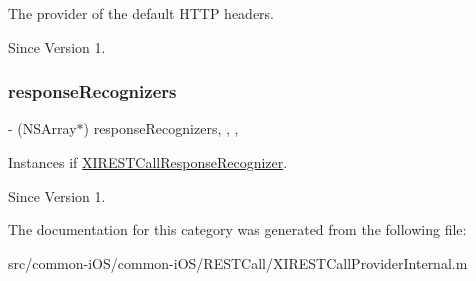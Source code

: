 The provider of the default H\+T\+TP headers. 

\begin{DoxySince}{Since}
Version 1. 
\end{DoxySince}
\hypertarget{category_x_i_r_e_s_t_call_provider_internal_07_08_a4237fa2603c1975960fb81854773b15a}{}\label{category_x_i_r_e_s_t_call_provider_internal_07_08_a4237fa2603c1975960fb81854773b15a} 
\subsubsection{\texorpdfstring{response\+Recognizers}{responseRecognizers}}
{\footnotesize\ttfamily -\/ (N\+S\+Array$\ast$) response\+Recognizers\hspace{0.3cm}{\ttfamily [read]}, {\ttfamily [write]}, {\ttfamily [nonatomic]}, {\ttfamily [strong]}}



Instances if \hyperlink{}{X\+I\+R\+E\+S\+T\+Call\+Response\+Recognizer}. 

\begin{DoxySince}{Since}
Version 1. 
\end{DoxySince}


The documentation for this category was generated from the following file\+:\begin{DoxyCompactItemize}
\item 
src/common-\/i\+O\+S/common-\/i\+O\+S/\+R\+E\+S\+T\+Call/X\+I\+R\+E\+S\+T\+Call\+Provider\+Internal.\+m\end{DoxyCompactItemize}
